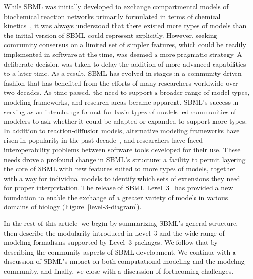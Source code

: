 \documentclass{sbml-paper}
\begin{document}
While SBML was initially developed to exchange compartmental models of biochemical reaction networks primarily formulated in terms of chemical kinetics~\citep{hucka_2001}, it was always understood that there existed more types of models than the initial version of SBML could represent explicitly. However, seeking community consensus on a limited set of simpler features, which could be readily implemented in software at the time, was deemed a more pragmatic strategy. A deliberate decision was taken to delay the addition of more advanced capabilities to a later time.  As a result, SBML has evolved in stages in a community-driven fashion that has benefited from the efforts of many researchers worldwide over two decades.  As time passed, the need to support a broader range of model types, modeling frameworks, and research areas became apparent.  SBML's success in serving as an interchange format for basic types of models led communities of modelers to ask whether it could be adapted or expanded to support more types.  In addition to reaction-diffusion models, alternative modeling frameworks have risen in popularity in the past decade~\citep{Machado2011modelinga}, and researchers have faced interoperability problems between software tools developed for their use.  These needs drove a profound change in SBML's structure: a facility to permit layering the core of SBML with new features suited to more types of models, together with a way for individual models to identify which sets of extensions they need for proper interpretation.  The release of SBML Level~3~\citep{Hucka2010a} has provided a new foundation to enable the exchange of a greater variety of models in various domains of biology (Figure~\ref{level-3-diagram}).

In the rest of this article, we begin by summarizing SBML's general structure, then describe the modularity introduced in Level~3 and the wide range of modeling formalisms supported by Level~3 packages.  We follow that by describing the community aspects of SBML development.  We continue with a discussion of SBML's impact on both computational modeling and the modeling community, and finally, we close with a discussion of forthcoming challenges.
\end{document}
